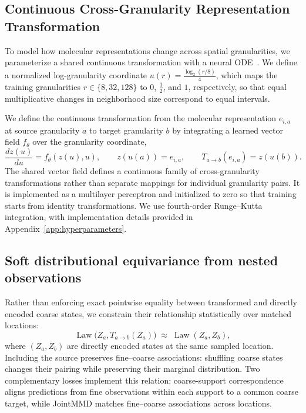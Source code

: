 \subsection{Continuous Cross-Granularity Representation Transformation}
\label{sec:coarse-support}

To model how molecular representations change across spatial granularities, we parameterize a shared continuous transformation with a neural ODE~\citep{chen2018neuralode}. We define a normalized log-granularity coordinate $u(r)=\frac{\log_2(r/8)}{4}$, which maps the training granularities $r\in\{8,32,128\}$ to $0$, $\frac{1}{2}$, and $1$, respectively, so that equal multiplicative changes in neighborhood size correspond to equal intervals.

We define the continuous transformation from the molecular representation $e_{i,a}$ at source granularity $a$ to target granularity $b$ by integrating a learned vector field $f_\theta$ over the granularity coordinate,
\begin{equation}
\frac{dz(u)}{du}=f_\theta(z(u),u),\qquad
z(u(a))=e_{i,a},\qquad T_{a\to b}(e_{i,a})=z(u(b)).
\label{eq:granularity-ode}
\end{equation}
The shared vector field defines a continuous family of cross-granularity transformations rather than separate mappings for individual granularity pairs. It is implemented as a multilayer perceptron and initialized to zero so that training starts from identity transformations. We use fourth-order Runge--Kutta integration, with implementation details provided in Appendix~\ref{app:hyperparameters}.

\subsection{Soft distributional equivariance from nested observations}
\label{sec:granularity-supervision}

Rather than enforcing exact pointwise equality between transformed and directly encoded coarse states, we constrain their relationship statistically over matched locations:
\begin{equation}
\operatorname{Law}\bigl(Z_a,T_{a\to b}(Z_a)\bigr)
\;\approx\;\operatorname{Law}(Z_a,Z_b),
\label{eq:granularity-equivariance}
\end{equation}
where $(Z_a,Z_b)$ are directly encoded states at the same sampled location. Including the source preserves fine--coarse associations: shuffling coarse states changes their pairing while preserving their marginal distribution. Two complementary losses implement this relation: coarse-support correspondence aligns predictions from fine observations within each support to a common coarse target, while JointMMD matches fine--coarse associations across locations.


